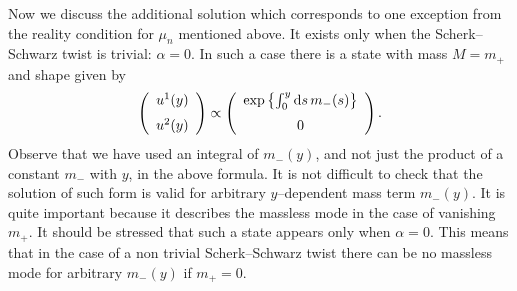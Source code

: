 \documentclass[a4paper,12pt]{article}
\def\al{\alpha}
\def\d{{\rm d}}
\begin{document}
Now we discuss the additional solution which corresponds to one
exception from the reality condition for $\mu_n$ mentioned above.
It exists only when the Scherk--Schwarz twist is trivial:
$\al=0$. In such a case there is a state with mass $M=m_+$ and shape
given by
\begin{equation}
\left(
\begin{array}{c}
u^1(y)\\[6pt]u^2(y)
\end{array}
\right)
\propto
\left(
\begin{array}{c}
\exp\left\{\int_0^y\d s\,m_-(s)\right\}\\[6pt]0
\end{array}
\right)
.
\end{equation}
Observe that we have used an integral of $m_-(y)$, and not 
just the product of a constant $m_-$ with $y$, in the above
formula. It is not difficult to check that the solution of such  
form is valid for arbitrary $y$--dependent mass term $m_-(y)$.
It is quite important because it describes the massless mode
in the case of vanishing $m_+$. It should be stressed that such a
state appears only when $\al=0$. This means that in the case of a non
trivial Scherk--Schwarz twist there can be no massless mode 
for arbitrary $m_-(y)$ if $m_+=0$. 
\end{document}
